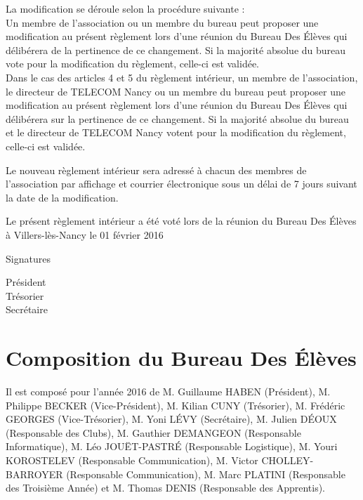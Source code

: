 \documentclass{article} %
\begin{document}
		La modification se déroule selon la procédure suivante : \\
		Un membre de l’association ou un membre du bureau peut proposer une
		modification au présent règlement lors d’une réunion du Bureau Des
		Élèves qui délibérera de la pertinence de ce changement. Si la majorité
		absolue du bureau vote pour la modification du règlement, celle-ci est
		validée. \\
		Dans le cas des articles 4 et 5 du règlement intérieur, un membre de
		l’association, le directeur de TELECOM Nancy ou un membre du bureau
		peut proposer une modification au présent règlement lors d’une réunion
		du Bureau Des Élèves qui délibérera sur la pertinence de ce changement.
		Si la majorité absolue du bureau et le directeur de TELECOM Nancy
		votent pour la modification du règlement, celle-ci est validée. 

		Le nouveau règlement intérieur sera adressé à chacun des membres de
		l'association par affichage et courrier électronique sous un délai de 7
		jours suivant la date de la modification.

    \vfill
	\begin{center}
		{\large\light Le présent règlement intérieur a été voté lors de la réunion
		du Bureau Des Élèves à Villers-lès-Nancy le 01 février 2016}
	\end{center}
	\vfill
	Signatures\par
	\begin{multicols}{3}
	    \begin{center}
	        Président \\
	        Trésorier \\
	        Secrétaire
	    \end{center}
	\end{multicols}
	\vspace{3cm}
	\clearpage

	\section*{Composition du Bureau Des Élèves}
		
		Il est composé pour l’année 2016 de M. Guillaume HABEN (Président), M.
		Philippe BECKER (Vice-Président), M. Kilian CUNY (Trésorier), M.
		Frédéric GEORGES (Vice-Trésorier), M. Yoni LÉVY (Secrétaire), M. Julien
		DÉOUX (Responsable des Clubs), M. Gauthier DEMANGEON (Responsable
		Informatique), M. Léo JOUËT-PASTRÉ (Responsable Logistique), M. Youri
		KOROSTELEV (Responsable Communication), M. Victor CHOLLEY-BARROYER
		(Responsable Communication), M. Marc PLATINI (Responsable des Troisième
		Année) et M. Thomas DENIS (Responsable des Apprentis).
\end{document}

